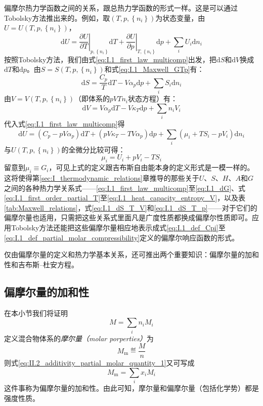 \documentclass[main.tex]{subfiles}
\begin{document}
偏摩尔热力学函数之间的关系，跟总热力学函数的形式一样。这是可以通过Tobolsky方法推出来的。例如，取$\left(T,p,\left\{n_i\right\}\right)$为状态变量，由$U=U\left(T,p,\left\{n_i\right\}\right)$，
\[\mathrm{d}U=\left.\frac{\partial U}{\partial T}\right|_{p,\left\{n_i\right\}}\mathrm{d}T+\left.\frac{\partial U}{\partial p}\right|_{T,\left\{n_i\right\}}\mathrm{d}p+\sum_i U_i\mathrm{d}n_i\]
按照Tobolsky方法，我们由式\eqref{eq:I.1_first_law_multicomp}出发，把$\mathrm{d}S$和$\mathrm{d}V$换成$\mathrm{d}T$和$\mathrm{d}p$。由$S=S\left(T,p,\left\{n_i\right\}\right)$和式\eqref{eq:I.1_Maxwell_GTp}有：
\[\mathrm{d}S=\frac{C_p}{T}\mathrm{d}T-V\alpha_p\mathrm{d}p+\sum_iS_i\mathrm{d}n_i\]
由$V=V\left(T,p,\left\{n_i\right\}\right)$（即体系的$pVTn_i$状态方程）有：
\[\mathrm{d}V=V\alpha_p\mathrm{d}T-V\kappa_T\mathrm{d}p+\sum_in_iV_i\]
代入式\eqref{eq:I.1_first_law_multicomp}得
\[\mathrm{d}U=\left(C_p-pV\alpha_p\right)\mathrm{d}T+\left(pV\kappa_T-TV\alpha_p\right)\mathrm{d}p+\sum_i\left(\mu_i+TS_i-pV_i\right)\mathrm{d}n_i\]
与$U\left(T,p,\left\{n_i\right\}\right)$的全微分比较可得：
\begin{equation}\label{eq:II.2_partial_molar_thermodynamic_functions_relation}
  \mu_i=U_i+pV_i-TS_i
\end{equation}
留意到$\mu_i\equiv G_i$，可见上式的定义跟吉布斯自由能本身的定义形式是一模一样的。这将使得第\ref{sec:I_thermodynamic_relations}章推导的那些关于$U$、$S$、$H$、$A$和$G$之间的各种热力学关系式——\eqref{eq:I.1_first_law_multicomp}至\eqref{eq:I.1_dG}、式\eqref{eq:I.1_first_order_partial_T}至\eqref{eq:I.1_heat_capacity_entropy_V}，以及表\ref{tab:Maxwell_relations}，式\eqref{eq:I.1_dS_T_V}和\eqref{eq:I.1_dS_T_p}——对于它们的偏摩尔量也适用，只需把这些关系式里面凡是广度性质都换成偏摩尔性质即可。应用Tobolsky方法还能把这些偏摩尔量相应地表示成式\eqref{eq:I.1_def_Cpi}至\eqref{eq:I.1_def_partial_molar_compressibility}定义的偏摩尔响应函数的形式。

仅由偏摩尔量的定义和热力学基本关系，还可推出两个重要知识：偏摩尔量的加和性和吉布斯--杜安方程。

\subsection{偏摩尔量的加和性}
在本小节我们将证明
\begin{equation}\label{eq:II.2_additivity_partial_molar_quantity_1}
  M=\sum_in_iM_i
\end{equation}
定义混合物体系的\emph{摩尔量（molar porperties）}为
\[M_\text{m}\eqdef \frac{M}{n}\]
则式\eqref{eq:II.2_additivity_partial_molar_quantity_1}又可写成
\begin{equation}\label{eq:II.2_additivity_partial_molar_quantity_2}
  M_\text{m}=\sum_ix_iM_i
\end{equation}
这件事称为偏摩尔量的加和性。由此可知，摩尔量和偏摩尔量（包括化学势）都是强度性质。
\end{document}
